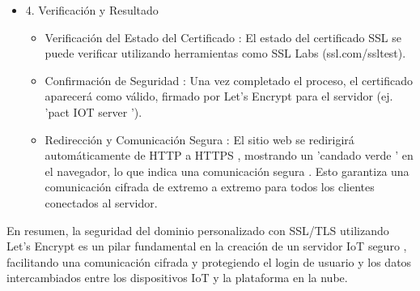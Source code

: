 \documentclass{report}
\begin{document}
\begin{itemize}
\begin{itemize}
    \end{itemize}
    \item 4. Verificación y Resultado
    \begin{itemize}
        \item Verificación del Estado del Certificado : El estado del certificado SSL se puede verificar utilizando herramientas como SSL Labs (ssl.com/ssltest).
        \item Confirmación de Seguridad : Una vez completado el proceso, el certificado aparecerá como válido, firmado por Let's Encrypt para el servidor (ej.  'pact IOT server ').
        \item Redirección y Comunicación Segura : El sitio web se  redirigirá automáticamente de HTTP a HTTPS , mostrando un  'candado verde ' en el navegador, lo que indica una  comunicación segura . Esto garantiza una  comunicación cifrada de extremo a extremo  para todos los clientes conectados al servidor.    
    \end{itemize}
\end{itemize}

En resumen, la seguridad del dominio personalizado con SSL/TLS utilizando Let's Encrypt es un pilar fundamental en la creación de un  servidor IoT seguro , 
facilitando una comunicación cifrada y protegiendo el login de usuario y los datos intercambiados entre los dispositivos IoT y la plataforma en la nube.
\end{document}
